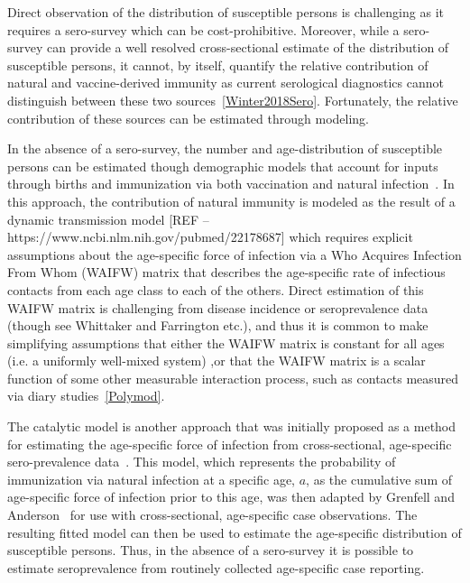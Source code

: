 \documentclass[nofootinbib,aps,pre,twocolumn,superscriptaddress,showkeys,showpacs]{revtex4-1}
\begin{document}
Direct observation of the distribution of susceptible persons is challenging as it requires a sero-survey which can be cost-prohibitive. 
Moreover, while a sero-survey can provide a well resolved cross-sectional estimate of the distribution of susceptible persons, it cannot, by itself, quantify the relative contribution of natural and vaccine-derived immunity as current serological diagnostics cannot distinguish between these two sources~\ref{Winter2018Sero}. Fortunately, the relative contribution of these sources can be estimated through modeling. 

In the absence of a sero-survey, the number and age-distribution of susceptible persons can be estimated though demographic models that account for inputs through births and immunization via both vaccination and natural infection~\cite{METCALF2017S14,TRENTINI20171089,Winter2018Sero}. In this approach, the contribution of natural immunity is modeled as the result of a dynamic transmission model [REF -- https://www.ncbi.nlm.nih.gov/pubmed/22178687] which requires explicit assumptions about the age-specific force of infection via a Who Acquires Infection From Whom (WAIFW) matrix that describes the age-specific rate of infectious contacts from each age class to each of the others.  Direct estimation of this WAIFW matrix is challenging from disease incidence or seroprevalence data (though see Whittaker and Farrington etc.), and thus it is common to make simplifying assumptions that either the WAIFW matrix is constant for all ages (i.e. a uniformly well-mixed system) ,or that the WAIFW matrix is a scalar function of some other measurable interaction process, such as contacts measured via diary studies~\ref{Polymod}.

The catalytic model is another approach that was initially proposed as a method for estimating the age-specific force of infection from cross-sectional, age-specific sero-prevalence data~\cite{griffiths_catalytic_1974}. 
This model, which represents the probability of immunization via natural infection at a specific age, $a$, as the cumulative sum of age-specific force of infection prior to this age, was then adapted by Grenfell and Anderson~\cite{Grenfell1985} for use with cross-sectional, age-specific case observations.  
The resulting fitted model can then be used to estimate the age-specific distribution of susceptible persons.
Thus, in the absence of a sero-survey it is possible to estimate seroprevalence from routinely collected age-specific case reporting.
\end{document}
